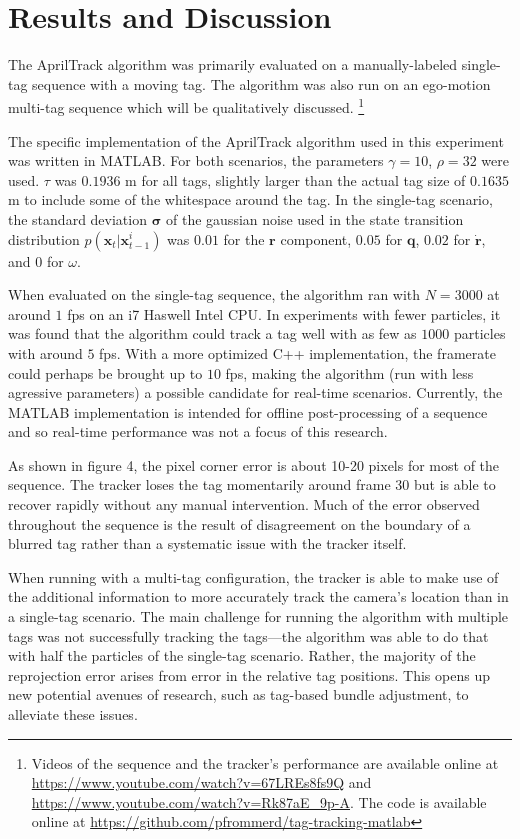 \documentclass[letterpaper, 10 pt, conference]{ieeeconf}
\renewcommand{\vec}[1]{\boldsymbol{#1}}
\begin{document}
\section{Results and Discussion}

The AprilTrack algorithm was primarily evaluated on a manually-labeled single-tag sequence with a moving tag. The algorithm was also run on an ego-motion multi-tag sequence which will be qualitatively discussed.
\footnote{Videos of the sequence and the tracker's performance are available online at \url{https://www.youtube.com/watch?v=67LREs8fs9Q} and \url{https://www.youtube.com/watch?v=Rk87aE_9p-A}. The code is available online at \url{https://github.com/pfrommerd/tag-tracking-matlab}}


The specific implementation of the AprilTrack algorithm used in this experiment was written in MATLAB. For both scenarios, the parameters $\gamma = 10$, $\rho=32$ were used. $\tau$ was $0.1936$ m for all tags, slightly larger than the actual tag size of $0.1635$ m to include some of the whitespace around the tag. In the single-tag scenario, the standard deviation $\vec{\sigma}$  of the gaussian noise used in the state transition distribution $p(\vec{x}_t|\vec{x}^i_{t-1})$ was $0.01$ for the $\vec{r}$ component, $0.05$ for $\vec{q}$, $0.02$ for $\dot{\vec{r}}$, and $0$ for $\omega$.


When evaluated on the single-tag sequence, the algorithm ran with $N=3000$ at around $1$ fps on an i7 Haswell Intel CPU. In experiments with fewer particles, it was found that the algorithm could track a tag well with as few as $1000$ particles with around $5$ fps. With a more optimized C++ implementation, the framerate could perhaps be brought up to $10$ fps, making the algorithm (run with less agressive parameters) a possible candidate for real-time scenarios. Currently, the MATLAB implementation is intended for offline post-processing of a sequence and so real-time performance was not a focus of this research.


As shown in figure 4, the pixel corner error is about 10-20 pixels for most of the sequence. The tracker loses the tag momentarily around frame 30 but is able to recover rapidly without any manual intervention. Much of the error observed throughout the sequence is the result of disagreement on the boundary of a blurred tag rather than a systematic issue with the tracker itself.

When running with a multi-tag configuration, the tracker is able to make use of the additional information to more accurately track the camera's location than in a single-tag scenario. The main challenge for running the algorithm with multiple tags was not successfully tracking the tags---the algorithm was able to do that with half the particles of the single-tag scenario. Rather, the majority of the reprojection error arises from error in the relative tag positions. This opens up new potential avenues of research, such as tag-based bundle adjustment, to alleviate these issues.
\end{document}
